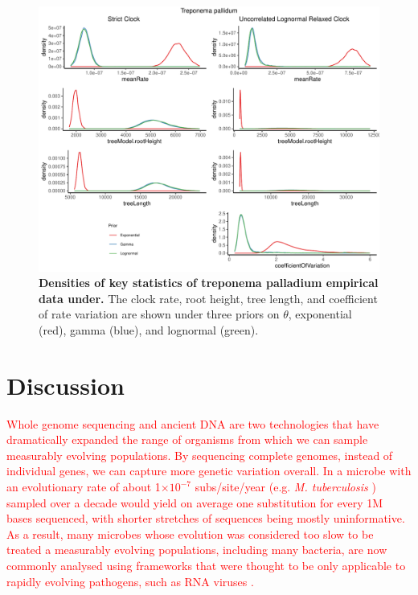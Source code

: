 \documentclass[10pt,letterpaper]{article}
\begin{document}
\begin{figure}[!h]
	\begin{center}
		\includegraphics[width=13cm]{sandbox_figures/treponema_density_plot.pdf}\newline
		\vspace{-0.5cm}
		\caption{\textbf{Densities of key statistics of treponema palladium empirical data under.} The clock rate, root height, tree length, and coefficient of rate variation are shown under three priors on $\theta$, exponential (red), gamma (blue), and lognormal (green).}
	\end{center}
\end{figure}




\section*{Discussion}

\textcolor{red}{
Whole genome sequencing and ancient DNA are two technologies that have dramatically expanded the range of organisms from which we can sample measurably evolving populations. By sequencing complete genomes, instead of individual genes, we can capture more genetic variation overall. In a microbe with an evolutionary rate of about 1$\times 10^{-7}$ subs/site/year (e.g. \textit{M. tuberculosis} \cite{menardo2019molecular}) sampled over a decade would yield on average one substitution for every 1M bases sequenced, with shorter stretches of sequences being mostly uninformative. As a result, many microbes whose evolution was considered too slow to be treated a measurably evolving populations, including many bacteria, are now commonly analysed using frameworks that were thought to be only applicable to rapidly evolving pathogens, such as RNA viruses \cite{biek2015measurably}.}
\end{document}
